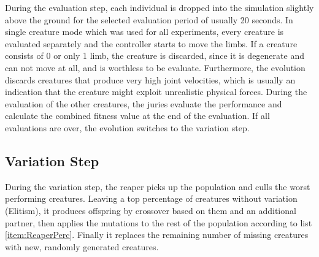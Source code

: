 \documentclass[main]{subfiles}
\begin{document}
During the evaluation step, each individual is dropped into the simulation slightly above the ground for the selected evaluation period of usually 20 seconds. %
%
In single creature mode which was used for all experiments, every creature is evaluated separately and the controller starts to move the limbs. %
%
If a creature consists of 0 or only 1 limb, the creature is discarded, since it is degenerate and can not move at all, and is worthless to be evaluate. %
%
Furthermore, the evolution discards creatures that produce very high joint velocities, which is usually an indication that the creature might exploit unrealistic physical forces. %
%
During the evaluation of the other creatures, the juries evaluate the performance and calculate the combined fitness value at the end of the evaluation. %
%
If all evaluations are over, the evolution switches to the variation step.

\subsection{Variation Step}

During the variation step, the reaper picks up the population and culls the worst performing creatures. %
%
Leaving a top percentage of creatures without variation (Elitism), it produces offspring by crossover based on them and an additional partner, then applies the mutations to the rest of the population according to list \ref{item:ReaperPerc}. %
%
Finally it replaces the remaining number of missing creatures with new, randomly generated creatures.
\end{document}
